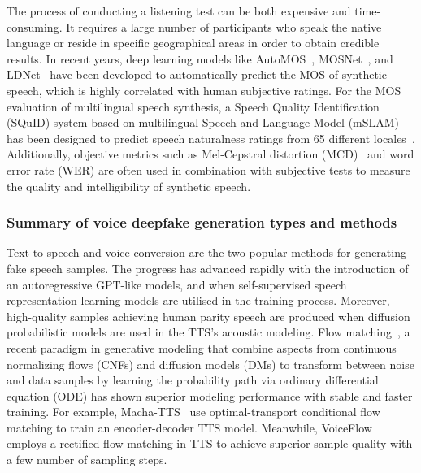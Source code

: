 The process of conducting a listening test can be both expensive and time-consuming. It requires a large number of participants who speak the native language or reside in specific geographical areas in order to obtain credible results. In recent years, deep learning models like AutoMOS~\cite{automos}, MOSNet~\cite{mosnet}, and LDNet~\cite{ldnet} have been developed to automatically predict the MOS of synthetic speech, which is highly correlated with human subjective ratings. For the MOS evaluation of multilingual speech synthesis, a Speech Quality Identification (SQuID) system based on multilingual Speech and Language Model (mSLAM) has been designed to predict speech naturalness ratings from 65 different locales~\cite{squid}. Additionally, objective metrics such as Mel-Cepstral distortion (MCD)~\cite{mcd} and word error rate (WER) are often used in combination with subjective tests to measure the quality and intelligibility of synthetic speech.


\subsubsection{Summary of voice deepfake generation types and methods}

Text-to-speech and voice conversion are the two popular methods for generating fake speech samples. The progress has advanced rapidly with the introduction of an autoregressive GPT-like models, and when self-supervised speech representation learning models are utilised in the training process. Moreover, high-quality samples achieving human parity speech are produced when diffusion probabilistic models are used in the TTS's acoustic modeling. Flow matching~\cite{lipman2023flow}, a recent paradigm in generative modeling that combine aspects from continuous normalizing flows (CNFs) and diffusion models (DMs) to transform between noise and data samples by learning the probability path via ordinary differential equation (ODE) has shown superior modeling performance with stable and faster training. For example, Macha-TTS~\cite{matcha2024}  use optimal-transport conditional flow matching to train an encoder-decoder TTS model. Meanwhile, VoiceFlow~\cite{voiceflow} employs a rectified flow matching in TTS to achieve superior sample quality with a few number of sampling steps. %

